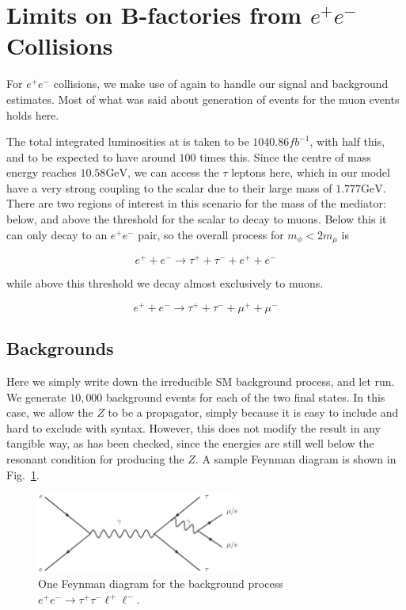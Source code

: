\section{Limits on B-factories from $e^+ e^-$ Collisions}
For $e^+ e^-$ collisions, we make use of \madgraph again to handle our signal and background estimates.
Most of what was said about generation of events for the muon events holds here.

The total integrated luminosities at \belle is taken to be $1040.86fb^{-1}$, with \babar half this, and \belletwo to be expected to have around $100$ times this.
Since the centre of mass energy reaches $10.58\textrm{GeV}$, we can access the $\tau$ leptons here, which in our model have a very strong coupling to the scalar due to their large mass of $1.777\textrm{GeV}$.
There are two regions of interest in this scenario for the mass of the mediator: below, and above the threshold for the scalar to decay to muons.
Below this it can only decay to an $e^+ e^-$ pair, so the overall process for $m_\phi < 2m_\mu$ is

\begin{equation}
    e^+ + e^- \rightarrow \tau^+ + \tau^- + e^+ + e^-
\end{equation}

\noindent while above this threshold we decay almost exclusively to muons.

\begin{equation}
    e^+ + e^- \rightarrow \tau^+ + \tau^- + \mu^+ + \mu^-
\end{equation}

\subsection{Backgrounds}
Here we simply write down the irreducible SM background process, and let \madgraph run.
We generate $10,000$ background events for each of the two final states.
In this case, we allow the $Z$ to be a propagator, simply because it is easy to include and hard to exclude with \madgraph syntax.
However, this does not modify the result in any tangible way, as has been checked, since the energies are still well below the resonant condition for producing the $Z$.
A sample Feynman diagram is shown in Fig.\ \ref{fig:ee_tautaull_SM}.

\begin{figure}[h]
    \centering
    \includegraphics[width=0.6\textwidth]{Figures/feynman_diagrams/ee_tautaull_SM}
    \caption{One Feynman diagram for the background process $e^+ e^- \rightarrow \tau^+ \tau^- \ell^+ \ell^-$.}
    \label{fig:ee_tautaull_SM}
\end{figure}

